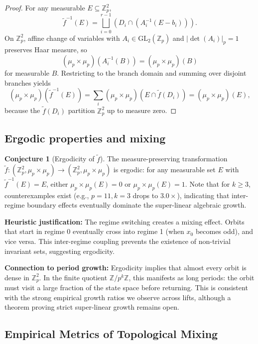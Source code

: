\documentclass[11pt]{article}
\theoremstyle{plain}
\theoremstyle{definition}
\newtheorem{conjecture}[theorem]{Conjecture}
\newcommand{\Z}{\mathbb{Z}}
\newcommand{\GL}{\mathrm{GL}}
\begin{document}
\begin{proof}
For any measurable $E\subseteq \Z_p^2$,
\[
\tilde f^{-1}(E)=\bigsqcup_{i=0}^{r-1}\left(D_i\cap (A_i^{-1}(E-b_i))\right).
\]
On $\Z_p^2$, affine change of variables with $A_i\in\GL_2(\Z_p)$ and $|\det(A_i)|_p=1$ preserves Haar measure, so
\[
(\mu_p\times\mu_p)\!\left(A_i^{-1}(B)\right)=(\mu_p\times\mu_p)(B)
\]
for measurable $B$. Restricting to the branch domain and summing over disjoint branches yields
\[
(\mu_p\times\mu_p)\!\left(\tilde f^{-1}(E)\right)
=\sum_i(\mu_p\times\mu_p)\!\left(E\cap \tilde f(D_i)\right)
=(\mu_p\times\mu_p)(E),
\]
because the $\tilde f(D_i)$ partition $\Z_p^2$ up to measure zero.
\end{proof}

\subsection{Ergodic properties and mixing}

\begin{conjecture}[Ergodicity of $\tilde{f}$]
\label{conj:ergodic}
The measure-preserving transformation $\tilde{f}\colon (\Z_p^2, \mu_p \times \mu_p) \to (\Z_p^2, \mu_p \times \mu_p)$ is ergodic: for any measurable set $E$ with $\tilde{f}^{-1}(E) = E$, either $\mu_p \times \mu_p(E) = 0$ or $\mu_p \times \mu_p(E) = 1$.
Note that for $k \ge 3$, counterexamples exist (e.g., $p=11, k=3$ drops to $3.0\times$), indicating that inter-regime boundary effects eventually dominate the super-linear algebraic growth.
\end{conjecture}

\textbf{Heuristic justification:} The regime switching creates a mixing effect. Orbits that start in regime 0 eventually cross into regime 1 (when $x_0$ becomes odd), and vice versa. This inter-regime coupling prevents the existence of non-trivial invariant sets, suggesting ergodicity.

\textbf{Connection to period growth:} Ergodicity implies that almost every orbit is dense in $\Z_p^2$. In the finite quotient $\Z/p^k\Z$, this manifests as long periods: the orbit must visit a large fraction of the state space before returning. This is consistent with the strong empirical growth ratios we observe across lifts, although a theorem proving strict super-linear growth remains open.

\subsection{Empirical Metrics of Topological Mixing}
\label{sec:ergodicity_verification}
\end{document}
